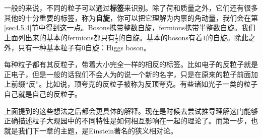 一般的来说，不同的粒子可以通过{\bfseries 标签}来识别。除了荷和质量之外，它们还有很多其他的十分重要的标签，称为{\bfseries 自旋}，你可以把它理解为内禀的角动量，我们会在第\ref{sec4.5.4}节中得到这一点。Bosons携带整数自旋，fermions携带半整数自旋。我们上面列出来的基本的fermions都只有$\tfrac{1}{2}$的自旋。基本的bosons有着$1$的自旋。除此之外，只有一种基本粒子有$0$自旋：Higgs boson。

每种粒子都有其反粒子，带着大小完全一样的相反的标签。比如电子的反粒子就是正电子，但是一般的话我们不会人为的说一个新的名字，只是在原来的粒子前面加上前缀``反''。比如说，顶夸克的反粒子被称为反顶夸克。有些诸如光子一类的粒子自己就是自己的反粒子。

上面提到的这些想法之后都会更具体的解释。现在是时候去尝试推导理解这门能够正确描述粒子大观园中的不同特性是如何相互影响在一起的理论了。而第一步，也就是我们下一章的主题，是Einstein著名的狭义相对论。




